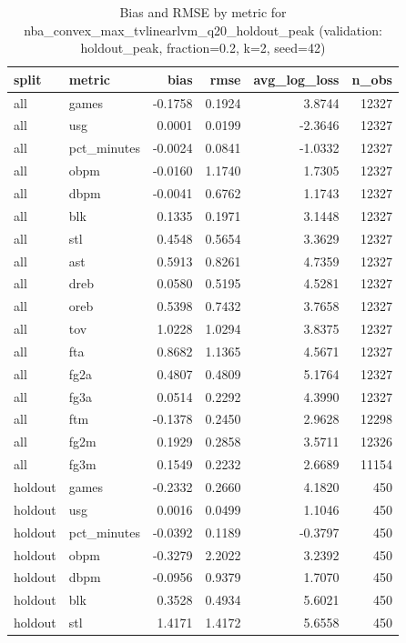 \begin{table}
\caption{Bias and RMSE by metric for nba_convex_max_tvlinearlvm_q20_holdout_peak (validation: holdout_peak, fraction=0.2, k=2, seed=42)}
\label{tab:nba_convex_max_tvlinearlvm_q20_holdout_peak_vs_holdout_peak_f20_k2_s42_bias_rmse}
\begin{tabular}{llrrrr}
\toprule
split & metric & bias & rmse & avg\_log\_loss & n\_obs \\
\midrule
all & games & -0.1758 & 0.1924 & 3.8744 & 12327 \\
all & usg & 0.0001 & 0.0199 & -2.3646 & 12327 \\
all & pct\_minutes & -0.0024 & 0.0841 & -1.0332 & 12327 \\
all & obpm & -0.0160 & 1.1740 & 1.7305 & 12327 \\
all & dbpm & -0.0041 & 0.6762 & 1.1743 & 12327 \\
all & blk & 0.1335 & 0.1971 & 3.1448 & 12327 \\
all & stl & 0.4548 & 0.5654 & 3.3629 & 12327 \\
all & ast & 0.5913 & 0.8261 & 4.7359 & 12327 \\
all & dreb & 0.0580 & 0.5195 & 4.5281 & 12327 \\
all & oreb & 0.5398 & 0.7432 & 3.7658 & 12327 \\
all & tov & 1.0228 & 1.0294 & 3.8375 & 12327 \\
all & fta & 0.8682 & 1.1365 & 4.5671 & 12327 \\
all & fg2a & 0.4807 & 0.4809 & 5.1764 & 12327 \\
all & fg3a & 0.0514 & 0.2292 & 4.3990 & 12327 \\
all & ftm & -0.1378 & 0.2450 & 2.9628 & 12298 \\
all & fg2m & 0.1929 & 0.2858 & 3.5711 & 12326 \\
all & fg3m & 0.1549 & 0.2232 & 2.6689 & 11154 \\
holdout & games & -0.2332 & 0.2660 & 4.1820 & 450 \\
holdout & usg & 0.0016 & 0.0499 & 1.1046 & 450 \\
holdout & pct\_minutes & -0.0392 & 0.1189 & -0.3797 & 450 \\
holdout & obpm & -0.3279 & 2.2022 & 3.2392 & 450 \\
holdout & dbpm & -0.0956 & 0.9379 & 1.7070 & 450 \\
holdout & blk & 0.3528 & 0.4934 & 5.6021 & 450 \\
holdout & stl & 1.4171 & 1.4172 & 5.6558 & 450 \\

\end{tabular}
\end{table}
